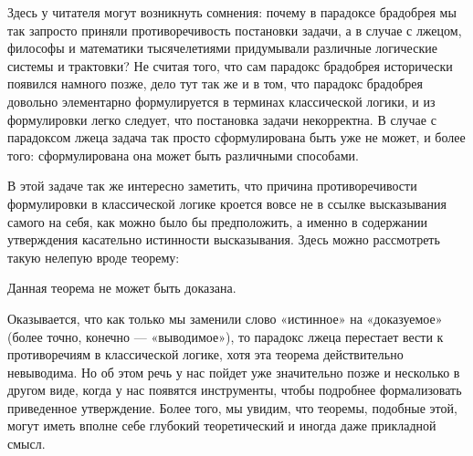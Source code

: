 Здесь у читателя могут возникнуть сомнения: почему в парадоксе брадобрея мы так запросто приняли противоречивость постановки задачи, а в случае с лжецом, философы и математики тысячелетиями придумывали различные логические системы и трактовки? Не считая того, что сам парадокс брадобрея исторически появился намного позже, дело тут так же и в том, что парадокс брадобрея довольно элементарно формулируется в терминах классической логики, и из формулировки легко следует, что постановка задачи некорректна. В случае с парадоксом лжеца задача так просто сформулирована быть уже не может, и более того: сформулирована она может быть различными способами.

В этой задаче так же интересно заметить, что причина противоречивости формулировки в классической логике кроется вовсе не в ссылке высказывания самого на себя, как можно было бы предположить, а именно в содержании утверждения касательно истинности высказывания. Здесь можно рассмотреть такую нелепую вроде теорему:

\begin{thm}Данная теорема не может быть доказана.\end{thm}

Оказывается, что как только мы заменили слово «истинное» на «доказуемое» (более точно, конечно — «выводимое»), то парадокс лжеца перестает вести к противоречиям в классической логике, хотя эта теорема действительно невыводима. Но об этом речь у нас пойдет уже значительно позже и несколько в другом виде, когда у нас появятся инструменты, чтобы подробнее формализовать приведенное утверждение. Более того, мы увидим, что теоремы, подобные этой, могут иметь вполне себе глубокий теоретический и иногда даже прикладной смысл.